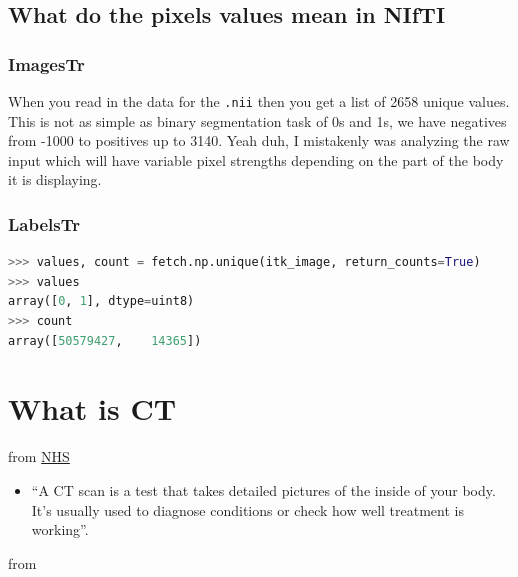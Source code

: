 \documentclass[11pt]{article}
\begin{document}
\subsection{What do the pixels values mean in NIfTI}

\subsubsection{ImagesTr}

When you read in the data for the \texttt{.nii} then you get a list of 2658 unique values. This is not as simple as binary segmentation task of 0s and 1s, we have negatives from -1000 to positives up to 3140. Yeah duh, I mistakenly was analyzing the raw input which will have variable pixel strengths depending on the part of the body it is displaying.

\subsubsection{LabelsTr}

\begin{lstlisting}[language=python]
>>> values, count = fetch.np.unique(itk_image, return_counts=True)
>>> values
array([0, 1], dtype=uint8)
>>> count
array([50579427,    14365])
\end{lstlisting}

\section{What is CT}

from \href{https://www.nhs.uk/conditions/ct-scan/}{NHS}

\begin{itemize}
    \item ``A CT scan is a test that takes detailed pictures of the inside of your body. It's usually used to diagnose conditions or check how well treatment is working''.
\end{itemize}

from \cite{ct-scan}
\end{document}
